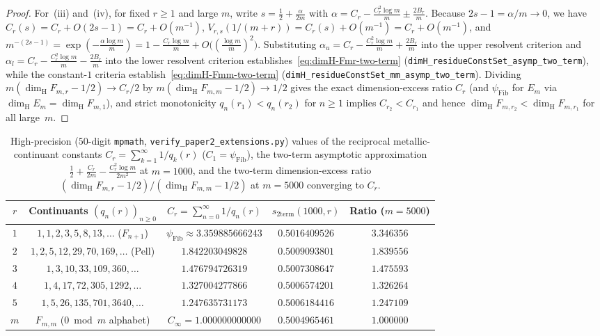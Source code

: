 \documentclass[11pt]{article}
\theoremstyle{definition}
\theoremstyle{remark}
\newcommand{\dimH}{\dim_{\mathrm{H}}}
\begin{document}
\begin{proof}
For~(iii) and~(iv), for fixed $r\ge1$ and large $m$, write $s=\frac12+\frac{\alpha}{2m}$
with $\alpha=C_r-\frac{C_r^2\log m}{m}\pm\frac{2B_r}{m}$. Because $2s-1=\alpha/m\to0$,
we have $C_r(s)=C_r+O(2s-1)=C_r+O(m^{-1})$,
$V_{r,s}(1/(m+r))=C_r(s)+O(m^{-1})=C_r+O(m^{-1})$, and
$m^{-(2s-1)}=\exp(-\frac{\alpha\log m}{m})=1-\frac{C_r\log m}{m}+O\bigl((\frac{\log m}{m})^2\bigr)$.
Substituting $\alpha_u=C_r-\frac{C_r^2\log m}{m}+\frac{2B_r}{m}$ into the upper
resolvent criterion and $\alpha_l=C_r-\frac{C_r^2\log m}{m}-\frac{2B_r}{m}$ into the
lower resolvent criterion establishes~\eqref{eq:dimH-Fmr-two-term}
(\texttt{dimH\_\allowbreak residueConstSet\_\allowbreak asymp\_\allowbreak two\_\allowbreak term}),
while the constant-$1$ criteria establish~\eqref{eq:dimH-Fmm-two-term}
(\texttt{dimH\_\allowbreak residueConstSet\_\allowbreak mm\_\allowbreak asymp\_\allowbreak two\_\allowbreak term}).
Dividing $m(\dimH F_{m,r}-1/2)\to C_r/2$ by $m(\dimH F_{m,m}-1/2)\to 1/2$ gives the
exact dimension-excess ratio $C_r$ (and $\psi_{\mathrm{Fib}}$ for $E_m$ via
$\dimH E_m=\dimH F_{m,1}$), and strict monotonicity $q_n(r_1)<q_n(r_2)$ for $n\ge1$
implies $C_{r_2}<C_{r_1}$ and hence $\dimH F_{m,r_2}<\dimH F_{m,r_1}$ for all large~$m$.
\end{proof}

\begin{table}[ht]
\centering\small\setlength{\tabcolsep}{4.5pt}
\begin{tabular}{c|c|c|c|c}
$r$ & Continuants $(q_n(r))_{n\ge0}$ & $C_r=\sum_{n=0}^\infty 1/q_n(r)$ & $s_{\mathrm{2term}}(1000,r)$ & Ratio ($m=5000$) \\\hline
$1$ & $1,1,2,3,5,8,13,\dots$ ($F_{n+1}$) & $\psi_{\mathrm{Fib}}\approx 3.359885666243$ & $0.5016409526$ & $3.346356$ \\
$2$ & $1,2,5,12,29,70,169,\dots$ (Pell) & $1.842203049828$ & $0.5009093801$ & $1.839556$ \\
$3$ & $1,3,10,33,109,360,\dots$ & $1.476794726319$ & $0.5007308647$ & $1.475593$ \\
$4$ & $1,4,17,72,305,1292,\dots$ & $1.327004277866$ & $0.5006574201$ & $1.326264$ \\
$5$ & $1,5,26,135,701,3640,\dots$ & $1.247635731173$ & $0.5006184416$ & $1.247109$ \\\hline
$m$ & $F_{m,m}$ ($0\bmod m$ alphabet) & $C_\infty=1.000000000000$ & $0.5004965461$ & $1.000000$
\end{tabular}
\caption{High-precision ($50$-digit \texttt{mpmath}, \texttt{verify\_\allowbreak paper2\_\allowbreak extensions.py}) values of the reciprocal metallic-continuant constants $C_r=\sum_{k=1}^\infty 1/q_k(r)$ ($C_1=\psi_{\mathrm{Fib}}$), the two-term asymptotic approximation $\frac12+\frac{C_r}{2m}-\frac{C_r^2\log m}{2m^2}$ at $m=1000$, and the two-term dimension-excess ratio $(\dimH F_{m,r}-1/2)/(\dimH F_{m,m}-1/2)$ at $m=5000$ converging to $C_r$.}\label{tab:residues-asymptotic}
\end{table}
\end{document}
